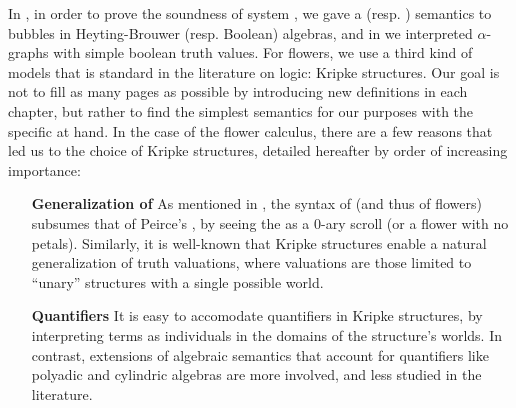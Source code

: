 In , in order to prove the soundness of system
, we gave a  (resp. ) semantics to bubbles in
Heyting-Brouwer (resp. Boolean) algebras, and in  we
interpreted $\alpha$-graphs with simple boolean truth values. For flowers, we
use a third kind of models that is standard in the literature on 
logic: Kripke structures. Our goal is not to fill as many pages as possible by
introducing new definitions in each chapter, but rather to find the simplest
semantics for our purposes with the specific  at hand. In the case
of the flower calculus, there are a few reasons that led us to the choice of
Kripke structures, detailed hereafter by order of increasing importance:
\begin{itemize}
  \item[\textbf{Generalization of \kl{EGs}}]
    As mentioned in , the syntax of   (and thus of
    flowers) subsumes that of Peirce's  , by seeing the  as a
    $0$-ary scroll (or a flower with no petals). Similarly, it is well-known
    that Kripke structures enable a natural generalization of truth valuations,
    where  valuations are those limited to ``unary'' structures with a
    single possible world.
  
  \item[\textbf{Quantifiers}]
    It is easy to accomodate quantifiers in Kripke structures, by interpreting
    terms as individuals in the domains of the structure's worlds. In contrast,
    extensions of algebraic semantics that account for quantifiers like polyadic
    and cylindric algebras are more involved, and less studied in the
    literature.
  

\end{itemize}

